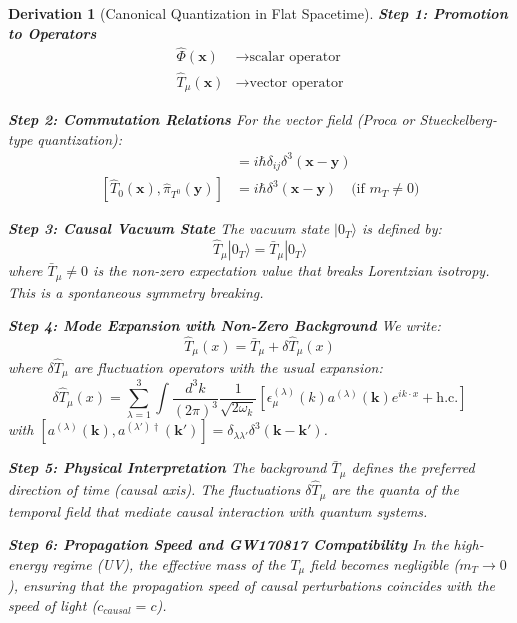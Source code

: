 \documentclass[10pt, a4paper]{article}
\newtheorem{derivation}{Derivation}
\begin{document}
\begin{derivation}[Canonical Quantization in Flat Spacetime]
\textbf{Step 1: Promotion to Operators}
\begin{align}
\hat{\Phi}(\mathbf{x}) &\rightarrow \text{scalar operator}
\tag{7.1} \\
\hat{T}_\mu(\mathbf{x}) &\rightarrow \text{vector operator}
\tag{7.2}
\end{align}

\textbf{Step 2: Commutation Relations}
For the vector field (Proca or Stueckelberg-type quantization):
\begin{align}
[\hat{T}_i(\mathbf{x}), \hat{\pi}_{T^j}(\mathbf{y})] &= i\hbar \delta_{ij} \delta^3(\mathbf{x} - \mathbf{y})
\tag{7.3} \\
[\hat{T}_0(\mathbf{x}), \hat{\pi}_{T^0}(\mathbf{y})] &= i\hbar \delta^3(\mathbf{x} - \mathbf{y}) \quad \text{(if $m_T \neq 0$)}
\tag{7.4}
\end{align}

\textbf{Step 3: Causal Vacuum State}
The vacuum state $|0_T\rangle$ is defined by:
\begin{equation}
\hat{T}_\mu |0_T\rangle = \bar{T}_\mu |0_T\rangle
\tag{7.5}
\end{equation}
where $\bar{T}_\mu \neq 0$ is the non-zero expectation value that breaks Lorentzian isotropy. This is a spontaneous symmetry breaking.

\textbf{Step 4: Mode Expansion with Non-Zero Background}
We write:
\begin{equation}
\hat{T}_\mu(x) = \bar{T}_\mu + \delta\hat{T}_\mu(x)
\tag{7.6}
\end{equation}
where $\delta\hat{T}_\mu$ are fluctuation operators with the usual expansion:
\begin{equation}
\delta\hat{T}_\mu(x) = \sum_{\lambda=1}^3 \int \frac{d^3k}{(2\pi)^3} \frac{1}{\sqrt{2\omega_k}} \left[ \epsilon_\mu^{(\lambda)}(k) a^{(\lambda)}(\mathbf{k}) e^{ik\cdot x} + \text{h.c.} \right]
\tag{7.7}
\end{equation}
with $[a^{(\lambda)}(\mathbf{k}), a^{(\lambda')\dagger}(\mathbf{k}')] = \delta_{\lambda\lambda'} \delta^3(\mathbf{k}-\mathbf{k}')$.

\textbf{Step 5: Physical Interpretation}
The background $\bar{T}_\mu$ defines the preferred direction of time (causal axis). The fluctuations $\delta\hat{T}_\mu$ are the quanta of the temporal field that mediate causal interaction with quantum systems.

\textbf{Step 6: Propagation Speed and GW170817 Compatibility}
In the high-energy regime (UV), the effective mass of the $T_\mu$ field becomes negligible ($m_T \to 0$), ensuring that the propagation speed of causal perturbations coincides with the speed of light ($c_{causal} = c$).


\end{derivation}
\end{document}
